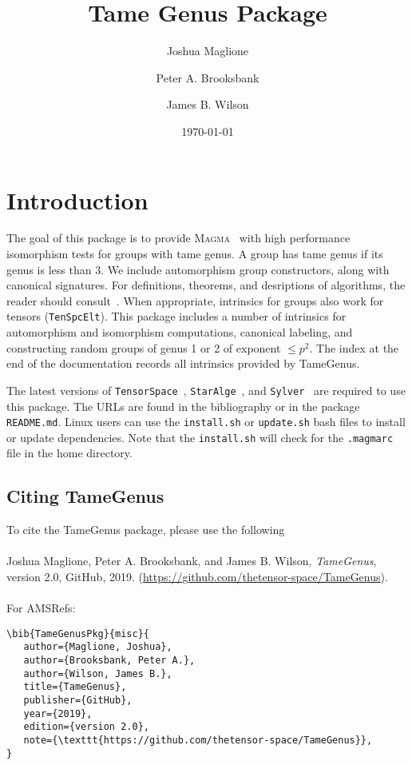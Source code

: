 \documentclass{documentation}
\title{Tame Genus Package}
\author{Joshua Maglione}
\author{Peter A. Brooksbank}
\author{James B. Wilson}
\date{\today}
\begin{document}
\frontmatter

\maketitle
\tableofcontents

\mainmatter

\chapter{Introduction}

The goal of this package is to provide \textsc{Magma}~\cite{Magma} with high performance isomorphism tests for groups with tame genus. A group has tame genus if its genus is less than $3$. We include automorphism group constructors, along with canonical signatures. For definitions, theorems, and desriptions of algorithms, the reader should consult~\cite{BMW}.
When appropriate, intrinsics for groups also work for tensors (\texttt{TenSpcElt}). 
This package includes a number of intrinsics for automorphism and isomorphism computations, canonical labeling, and constructing random groups of genus 1 or 2 of exponent  $\leq p^2$. The index at the end of the documentation records all intrinsics provided by \textsf{TameGenus}. 

The latest versions of \texttt{TensorSpace}~\cite{TensorSpacePackage}, \texttt{StarAlge}~\cite{StarAlge}, and \texttt{Sylver}~\cite{Sylver} are required to use this package. 
The URLs are found in the bibliography or in the package \texttt{README.md}. Linux users can use the \texttt{install.sh} or \texttt{update.sh} bash files to install or update dependencies. Note that the \texttt{install.sh} will check for the \texttt{.magmarc} file in the home directory.

\section{Citing \textsf{TameGenus}} 
To cite the \textsf{TameGenus} package, please use the following\\
\\
Joshua Maglione, Peter A. Brooksbank, and James B. Wilson, \emph{TameGenus}, version 2.0, GitHub, 2019. (\url{https://github.com/thetensor-space/TameGenus}). \\
\\
For AMSRefs:
\begin{verbatim}
\bib{TameGenusPkg}{misc}{
   author={Maglione, Joshua},
   author={Brooksbank, Peter A.},
   author={Wilson, James B.},
   title={TameGenus},
   publisher={GitHub},
   year={2019},
   edition={version 2.0},
   note={\texttt{https://github.com/thetensor-space/TameGenus}},
}
\end{verbatim}
\end{document}
